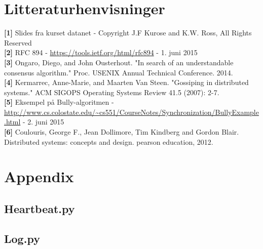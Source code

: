\documentclass[a4paper,12pt]{article}
\begin{document}
\section{Litteraturhenvisninger}
\textbf{[1]} Slides fra kurset datanet - Copyright J.F Kurose and K.W. Ross, All Rights Reserved
\\[5px]
\textbf{[2]} RFC 894 - \url{https://tools.ietf.org/html/rfc894} - 1. juni 2015
\\[5px]
\textbf{[3]} Ongaro, Diego, and John Ousterhout. "In search of an understandable consensus algorithm." Proc. USENIX Annual Technical Conference. 2014.
\\[5px]
\textbf{[4]} Kermarrec, Anne-Marie, and Maarten Van Steen. "Gossiping in distributed systems." ACM SIGOPS Operating Systems Review 41.5 (2007): 2-7.
\\[5px]
\textbf{[5]} Eksempel på Bully-algoritmen - \url{http://www.cs.colostate.edu/~cs551/CourseNotes/Synchronization/BullyExample.html} - 2. juni 2015
\\[5px]
\textbf{[6]} Coulouris, George F., Jean Dollimore, Tim Kindberg and Gordon Blair. Distributed systems: concepts and design. pearson education, 2012.
\newpage

\section{Appendix}
\subsection{Heartbeat.py}


\subsection{Log.py}

\end{document}
